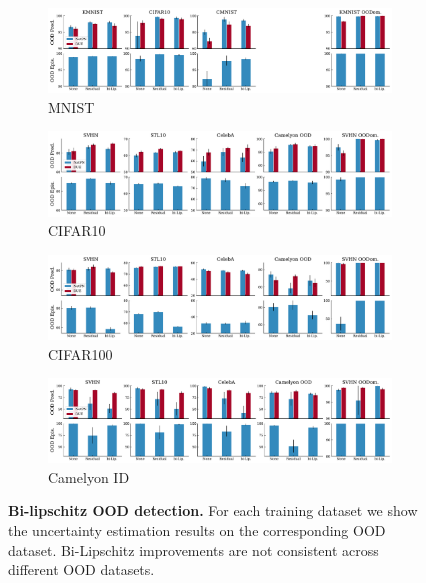 \begin{figure}[!htb]
    \centering
    \begin{subfigure}[b]{\textwidth}
        \includegraphics[width=\textwidth]{sections/008_iclr2023/figures/bi_bar_ood_mnist.pdf}
        \caption{MNIST}
        \label{fig:bi_bar_ood_mnist}
    \end{subfigure}
    \begin{subfigure}[b]{\textwidth}
        \includegraphics[width=\textwidth]{sections/008_iclr2023/figures/bi_bar_ood_cifar10.pdf}
        \caption{CIFAR10}
        \label{fig:bi_bar_ood_cifar10}
    \end{subfigure}
    \begin{subfigure}[b]{\textwidth}
        \includegraphics[width=\textwidth]{sections/008_iclr2023/figures/bi_bar_ood_cifar100.pdf}
        \caption{CIFAR100}
        \label{fig:bi_bar_ood_cifar100}
    \end{subfigure}
    \begin{subfigure}[b]{\textwidth}
        \includegraphics[width=\textwidth]{sections/008_iclr2023/figures/bi_bar_ood_camelyon_id.pdf}
        \caption{Camelyon ID}
        \label{fig:bi_bar_ood_camelyon}
    \end{subfigure}
    
    \caption{\textbf{Bi-lipschitz OOD detection.} For each training dataset we show the uncertainty estimation results on the corresponding OOD dataset. Bi-Lipschitz improvements are not consistent across different OOD datasets. }
    \label{fig:bi_ood}
\end{figure}


